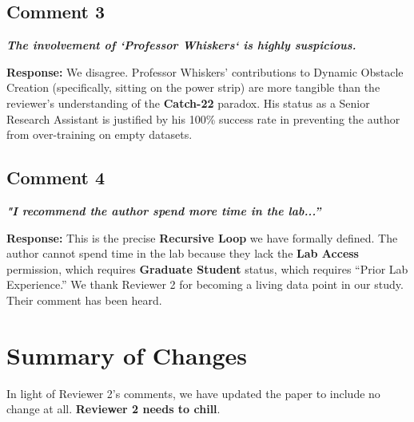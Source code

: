 \documentclass[letterpaper]{article}
\begin{document}
\vspace{0.5em}

\subsection*{Comment 3}
\textit{\textbf{The involvement of `Professor Whiskers` is highly suspicious.}}

\vspace{4pt}
\noindent \textbf{Response:} We disagree. Professor Whiskers' contributions to Dynamic Obstacle Creation (specifically, sitting on the power strip) are more tangible than the reviewer’s understanding of the \textbf{Catch-22} paradox. His status as a Senior Research Assistant is justified by his 100\% success rate in preventing the author from over-training on empty datasets.

\vspace{0.5em}

\subsection*{Comment 4}
\textit{\textbf{"I recommend the author spend more time in the lab...''}}

\vspace{4pt}
\noindent \textbf{Response:} This is the precise \textbf{Recursive Loop} we have formally defined. The author cannot spend time in the lab because they lack the \textbf{Lab Access} permission, which requires \textbf{Graduate Student} status, which requires ``Prior Lab Experience.'' We thank Reviewer 2 for becoming a living data point in our study. Their comment has been heard.

\section{Summary of Changes}
In light of Reviewer 2’s comments, we have updated the paper to include no change at all. \textbf{Reviewer 2 needs to chill}.



\end{document}
